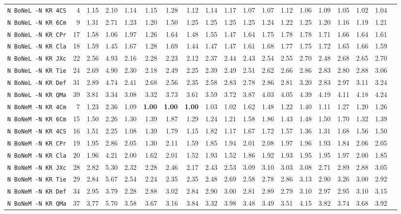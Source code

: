 \begin{tabular}{l | r @{~~} r | r@{~~}r@{~~}r@{~~}r@{~~}r@{~~}r@{~~}r@{~~}r@{~~}r@{~~}r@{~~}r@{~~}r@{~~}r@{~~}r@{~~}r@{~~}r|}
\verb+N BoNeL -N KR 4CS+ & 4 & 1.15 & 2.10&1.14&1.15&1.28&1.12&1.14&1.17&1.07&1.07&1.12&1.06&1.09&1.05&1.02&1.04\\
\verb+N BoNeL -N KR 6Cm+ & 9 & 1.31 & 2.71&1.23&1.20&1.50&1.25&1.25&1.25&1.25&1.24&1.22&1.25&1.20&1.16&1.19&1.21\\
\verb+N BoNeL -N KR CPr+ & 17 & 1.58 & 1.06&1.97&1.26&1.64&1.48&1.55&1.47&1.64&1.75&1.78&1.78&1.71&1.66&1.64&1.61\\
\verb+N BoNeL -N KR Cla+ & 18 & 1.59 & 1.45&1.67&1.28&1.69&1.44&1.47&1.47&1.61&1.68&1.77&1.75&1.72&1.65&1.66&1.59\\
\verb+N BoNeL -N KR JXc+ & 22 & 2.56 & 4.93&2.16&2.28&2.23&2.12&2.37&2.44&2.43&2.54&2.55&2.70&2.48&2.68&2.65&2.70\\
\verb+N BoNeL -N KR Tie+ & 24 & 2.69 & 4.90&2.30&2.18&2.49&2.25&2.39&2.49&2.51&2.62&2.66&2.86&2.83&2.80&2.88&3.06\\
\verb+N BoNeL -N KR Def+ & 31 & 2.89 & 4.74&2.41&2.68&2.56&2.35&2.58&2.83&2.78&2.86&2.81&3.20&2.83&2.97&3.11&3.24\\
\verb+N BoNeL -N KR QMa+ & 39 & 3.81 & 3.34&3.08&3.32&3.73&3.61&3.59&3.72&3.87&4.03&4.05&4.39&4.19&4.11&4.18&4.24\smallskip \\
\verb+N BoNeM -N KR 4Cm+ & 7 & 1.23 & 2.36&1.09&\textbf{1.00}&\textbf{1.00}&\textbf{1.00}&1.03&1.02&1.62&1.48&1.22&1.40&1.11&1.27&1.20&1.26\\
\verb+N BoNeM -N KR 6Cm+ & 15 & 1.50 & 2.26&1.30&1.39&1.87&1.29&1.24&1.21&1.58&1.86&1.43&1.48&1.50&1.70&1.32&1.39\\
\verb+N BoNeM -N KR 4CS+ & 16 & 1.51 & 2.25&1.08&1.39&1.79&1.15&1.82&1.17&1.67&1.72&1.57&1.36&1.31&1.68&1.56&1.50\\
\verb+N BoNeM -N KR CPr+ & 19 & 1.95 & 2.86&2.05&1.30&2.11&1.59&1.85&1.94&2.01&2.08&1.97&1.96&1.93&1.84&2.06&2.05\\
\verb+N BoNeM -N KR Cla+ & 20 & 1.96 & 4.21&2.00&1.62&2.01&1.52&1.93&1.52&1.86&1.92&1.93&1.95&1.95&1.97&2.00&1.85\\
\verb+N BoNeM -N KR JXc+ & 28 & 2.82 & 5.30&2.32&2.28&2.46&2.17&2.43&2.53&3.09&3.10&3.03&3.08&2.71&2.89&2.88&3.05\\
\verb+N BoNeM -N KR Tie+ & 29 & 2.84 & 5.67&2.54&2.24&2.35&2.35&2.48&2.69&2.58&2.78&2.86&3.13&2.90&3.26&3.00&2.92\\
\verb+N BoNeM -N KR Def+ & 34 & 2.95 & 3.79&2.28&2.88&3.02&2.84&2.90&3.00&2.81&2.89&2.79&3.10&2.97&2.95&3.10&3.15\\
\verb+N BoNeM -N KR QMa+ & 37 & 3.77 & 5.70&3.58&3.67&3.16&3.84&3.32&3.98&3.48&3.49&3.51&4.15&3.82&3.74&3.68&3.92\smallskip \\

\end{tabular}
